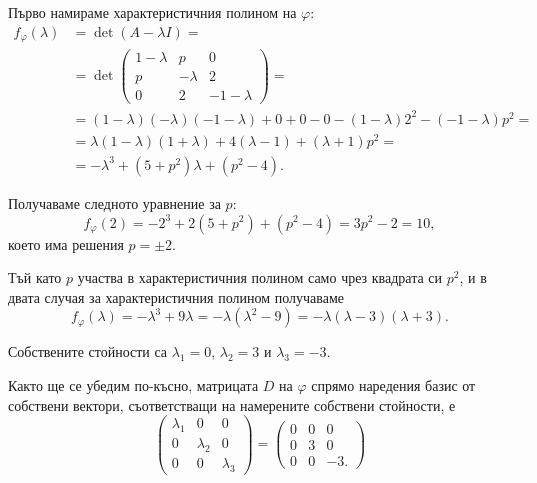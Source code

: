 \documentclass[numbers=endperiod, DIV=15, bibliography=totocnumbered]{scrartcl}
\begin{document}
\begin{solution}
  Първо намираме характеристичния полином на $\varphi$:
  \begin{align*}
    f_\varphi(\lambda)
    &=
    \det(A - \lambda I)
    = \\ &=
    \det \begin{pmatrix}
      1 - \lambda & p & 0 \\
      p & -\lambda & 2 \\
      0 & 2 & -1-\lambda
    \end{pmatrix}
    = \\ &=
    (1-\lambda) (-\lambda) (-1-\lambda) + 0 + 0 - 0 - (1-\lambda) 2^2 - (-1-\lambda) p^2
    = \\ &=
    \lambda (1 - \lambda) (1 + \lambda) + 4 (\lambda - 1) + (\lambda + 1) p^2
    = \\ &=
    -\lambda^3 + (5 + p^2) \lambda + (p^2 - 4).
  \end{align*}

  Получаваме следното уравнение за $p$:
  \begin{displaymath}
    f_\varphi(2) = -2^3 + 2 (5+p^2) + (p^2-4) = 3 p^2 - 2 = 10,
  \end{displaymath}
  което има решения $p = \pm 2$.

  Тъй като $p$ участва в характеристичния полином само чрез квадрата си $p^2$, и в двата случая за характеристичния полином получаваме
  \begin{displaymath}
    f_\varphi(\lambda) = -\lambda^3 + 9 \lambda = -\lambda(\lambda^2 - 9) = \boxed{-\lambda (\lambda - 3) (\lambda + 3)}.
  \end{displaymath}

  Собствените стойности са $\lambda_1 = 0$, $\lambda_2 = 3$ и $\lambda_3 = -3$.

  Както ще се убедим по-късно, матрицата $D$ на $\varphi$ спрямо наредения базис от собствени вектори, съответстващи на намерените собствени стойности, е
  \begin{displaymath}
    \begin{pmatrix}
      \lambda_1 & 0 & 0 \\
      0 & \lambda_2 & 0 \\
      0 & 0 & \lambda_3
    \end{pmatrix}
    =
    \begin{pmatrix}
      0 & 0 & 0 \\
      0 & 3 & 0 \\
      0 & 0 & -3.
    \end{pmatrix}
  \end{displaymath}


\end{solution}
\end{document}
